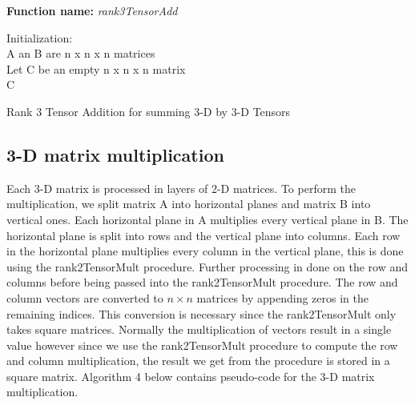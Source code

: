 \documentclass[10pt,journal]{article}
\begin{document}
\bigbreak
\begin{algorithm}[H]
\SetAlgoLined
\textbf{Function name:} \emph{rank3TensorAdd}

Initialization\::\\ 
 A an B are n x n x n matrices\\
 Let C be an empty n x n x n matrix\\

\Return C

\caption{Rank 3 Tensor Addition for summing 3-D by 3-D Tensors}
\end{algorithm}

\subsection{3-D matrix multiplication}
Each 3-D matrix is processed in layers of 2-D matrices. To perform the multiplication, we split matrix A into horizontal planes and matrix B into vertical ones. Each horizontal plane in A multiplies every vertical plane in B. The horizontal plane is split into rows and the vertical plane into columns. Each row in the horizontal plane multiplies every column in the vertical plane, this is done using the rank2TensorMult procedure. Further processing in done on the row and columns before being passed into the rank2TensorMult procedure. The row and column vectors are converted to $n \times n$ matrices by appending zeros in the remaining indices. This conversion is necessary since the rank2TensorMult only takes square matrices. Normally the multiplication of vectors result in a single value however since we use the rank2TensorMult procedure to compute the row and column multiplication, the result we get from the procedure is stored in a square matrix. Algorithm 4 below contains pseudo-code for the 3-D matrix multiplication.
\end{document}
